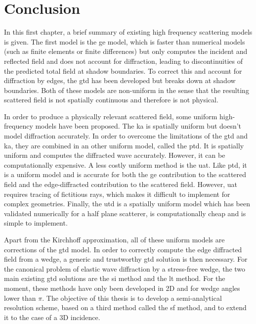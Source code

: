 \section*{Conclusion}
In this first chapter, a brief summary of existing high frequency scattering models is given. The first model is the \acrfull{ge} model, which is faster than numerical models (such as finite elements or finite differences) but only computes the incident and reflected field and does not account for diffraction, leading to discontinuities of the predicted total field at shadow boundaries. To correct this and account for diffraction by edges, the \acrfull{gtd} has been developed but breaks down at shadow boundaries. Both of these models are non-uniform in the sense that the resulting scattered field is not spatially continuous and therefore is not physical. 

In order to produce a physically relevant scattered field, some uniform high-frequency models have been proposed. The \acrfull{ka} is spatially uniform but doesn't model diffraction accurately. In order to overcome the limitations of the \acrshort{gtd} and \acrshort{ka}, they are combined in an other uniform model, called the \acrfull{ptd}. It is spatially uniform and computes the diffracted wave accurately. However, it can be computationally expensive. A less costly uniform method is the \acrfull{uat}. Like \acrshort{ptd}, it is a uniform model and is accurate for both the \acrshort{ge} contribution to the scattered field and the edge-diffracted contribution to the scattered field. However, \acrshort{uat} requires tracing of fictitious rays, which makes it difficult to implement for complex geometries. Finally, the \acrfull{utd} is a spatially uniform model which has been validated numerically for a half plane scatterer, is computationally cheap and is simple to implement.

Apart from the Kirchhoff approximation, all of these uniform models are corrections of the \acrshort{gtd} model. In order to correctly compute the edge diffracted field from a wedge, a generic and trustworthy \acrshort{gtd} solution is then necessary. For the canonical problem of elastic wave diffraction by a stress-free wedge, the two main existing \acrshort{gtd} solutions are the \acrfull{si} method and the \acrfull{lt} method. For the moment, these methods have only been developed in 2D and for wedge angles lower than $\pi$. The objective of this thesis is to develop a semi-analytical resolution scheme, based on a third method called the \acrfull{sf} method, and to extend it to the case of a 3D incidence.